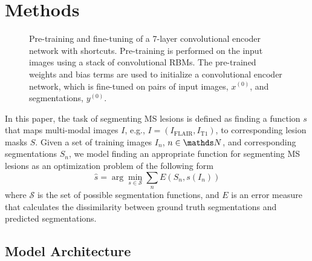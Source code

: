 \section{Methods}
\label{sec:method}

\begin{figure*}[tb]
\centering


\caption{Pre-training and fine-tuning of a 7-layer convolutional encoder network
with shortcuts. Pre-training is performed on the input images using a stack of
convolutional RBMs. The pre-trained weights and bias terms are used to initialize
a convolutional encoder network, which is fine-tuned on pairs of input images,
$x^{(0)}$, and segmentations, $y^{(0)}$.}

\label{fig:network}
\end{figure*}

In this paper, the task of segmenting MS lesions is defined as finding a
function $s$ that maps multi-modal images $I$, e.g., $I = (I_\text{FLAIR},
I_\text{T1})$, to corresponding lesion masks $S$. Given a set of
training images $I_n$, $n \in \N$, and corresponding segmentations $S_n$, we
model finding an appropriate function for segmenting MS lesions as an
optimization problem of the following form
\begin{equation}
\hat{s} = \arg \min_{s \in \mathcal{S}} \sum_n E(S_n, s(I_n))
\label{eq:segprob}
\end{equation}
where $\mathcal{S}$ is the set of possible segmentation functions, and $E$ is an
error measure that calculates the dissimilarity between ground truth
segmentations and predicted segmentations.

\subsection{Model Architecture}


